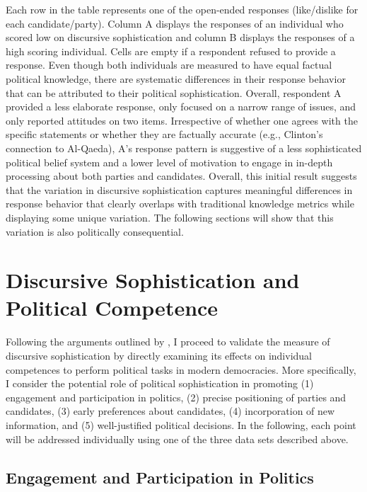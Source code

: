 \documentclass[12pt]{article}
\begin{document}
Each row in the table represents one of the open-ended responses (like/dislike for each candidate/party). Column A displays the responses of an individual who scored low on discursive sophistication and column B displays the responses of a high scoring individual. Cells are empty if a respondent refused to provide a response. Even though both individuals are measured to have equal factual political knowledge, there are systematic differences in their response behavior that can be attributed to their political sophistication. Overall, respondent A provided a less elaborate response, only focused on a narrow range of issues, and only reported attitudes on two items. Irrespective of whether one agrees with the specific statements or whether they are factually accurate (e.g., Clinton's connection to Al-Qaeda), A's response pattern is suggestive of a less sophisticated political belief system and a lower level of motivation to engage in in-depth processing about both parties and candidates. Overall, this initial result suggests that the variation in discursive sophistication captures meaningful differences in response behavior that clearly overlaps with traditional knowledge metrics while displaying some unique variation. The following sections will show that this variation is also politically consequential.



\section*{Discursive Sophistication and Political Competence}

Following the arguments outlined by \citet{lupia2006elitism,lupia2015uninformed}, I proceed to validate the measure of discursive sophistication by directly examining its effects on individual competences to perform political tasks in modern democracies. More specifically, I consider the potential role of political sophistication in promoting (1) engagement and participation in politics, (2) precise positioning of parties and candidates, (3) early preferences about candidates, (4) incorporation of new information, and (5) well-justified political decisions. In the following, each point will be addressed individually using one of the three data sets described above.

\subsection*{Engagement and Participation in Politics}
\end{document}
